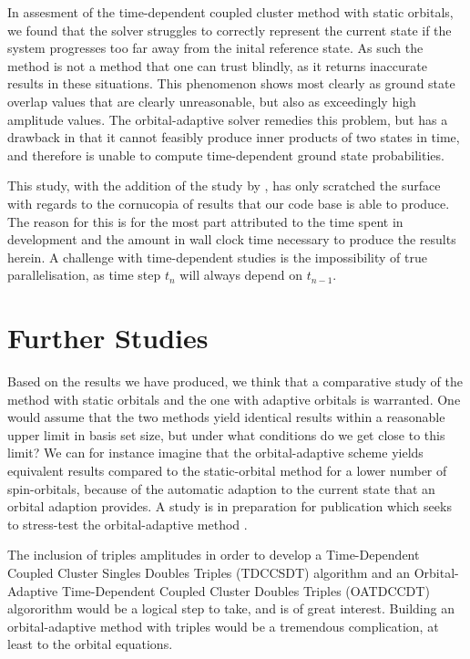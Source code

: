In assesment of the time-dependent coupled cluster method with static orbitals,
we found that the solver struggles to correctly represent the current state if 
the system progresses too far away from the inital reference state. As such the 
method is not a method that one can trust blindly, as it returns
inaccurate results in these situations. This phenomenon shows most clearly as 
ground state overlap values that are clearly unreasonable, but also as exceedingly
high amplitude values.
The orbital-adaptive solver remedies this problem, but has a drawback 
in that it cannot feasibly produce inner products of two states in time, and therefore 
is unable to compute time-dependent ground state probabilities.

This study, with the addition of the study by \citeauthor{islandwind2019} \cite{islandwind2019},
has only scratched the surface with regards to the cornucopia of results that our 
code base is able to produce. The reason for this is for the most part attributed to 
the time spent in development and the amount in wall clock time necessary to 
produce the results herein. A challenge with time-dependent studies is the 
impossibility of true parallelisation, as time step $t_n$ will always depend 
on $t_{n-1}$.

\section{Further Studies}

Based on the results we have produced, we think that a comparative study 
of the method with static orbitals and the one with adaptive orbitals is warranted.
One would assume that the two methods yield identical results within a reasonable 
upper limit in basis set size, but under what conditions do we get close to this
limit? We can for instance imagine that the orbital-adaptive scheme yields equivalent
results compared to the static-orbital method for a lower number of spin-orbitals,
because of the automatic adaption to the current state that an orbital adaption 
provides. A study is in preparation for publication which seeks to stress-test
the orbital-adaptive method \cite{islandwind2019numerically}.

The inclusion of triples amplitudes in order to develop a Time-Dependent Coupled Cluster Singles 
Doubles Triples (TDCCSDT) algorithm and an Orbital-Adaptive Time-Dependent Coupled Cluster 
Doubles Triples (OATDCCDT) algororithm would be a logical step to take, and is of 
great interest. Building an orbital-adaptive method with triples would be a tremendous 
complication, at least to the orbital equations.

